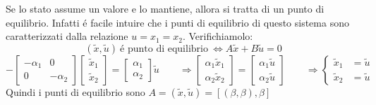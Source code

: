 \documentclass[../main.tex]{subfiles}
\begin{document}
\begin{mdframed}[style=Exercise]
\begin{Exercise}[title={Studiare la controllabilit\'a di due rami RC in parallelo}, difficulty=3]
				Se lo stato assume un valore e lo mantiene, allora si tratta di un punto di equilibrio. Infatti \'e facile intuire che i punti di equilibrio di questo sistema sono caratterizzati dalla relazione $ u = x_1 = x_2 $. Verifichiamolo:
				\[
					(\tilde x, \tilde u)\ \text{\'e punto di equilibrio}\ \Leftrightarrow A\tilde x + B \tilde u = 0
				\]
				\[
					-\begin{bmatrix}
						-\alpha_1 & 0\\
						0 & -\alpha_2
					\end{bmatrix}
					\begin{bmatrix}
						\tilde x_1\\
						\tilde x_2
					\end{bmatrix} =
					\begin{bmatrix}
						\alpha_1\\
						\alpha_2
					\end{bmatrix} \tilde u \qquad\Rightarrow
					\begin{bmatrix}
						\alpha_1 \tilde x_1\\
						\alpha_2 \tilde x_2
					\end{bmatrix} =
					\begin{bmatrix}
						\alpha_1 \tilde u\\
						\alpha_2 \tilde u
					\end{bmatrix} \qquad\Rightarrow
					\begin{cases}
						\tilde x_1 &= \tilde u\\
						\tilde x_2 &= \tilde u
					\end{cases}
				\]
				Quindi i punti di equilibrio sono $ A = (\tilde x, \tilde u) = \left[ (\beta, \beta), \beta \right] $
			\end{Exercise}
		\end{mdframed}
	
\end{document}
